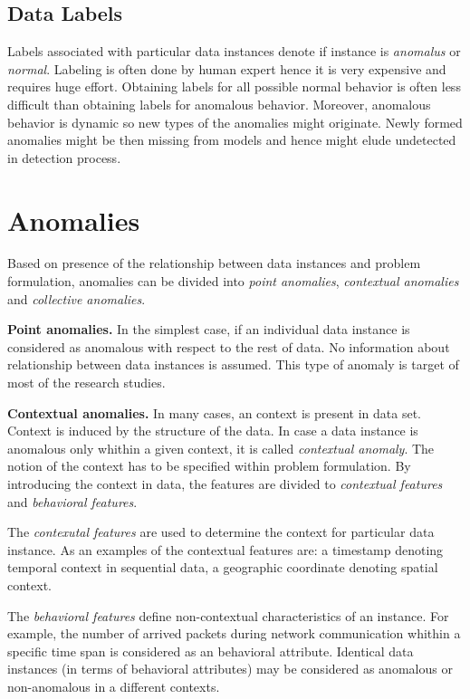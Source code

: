 \subsection{Data Labels}

Labels associated with particular data instances denote if instance is \emph{anomalus}
or \emph{normal}. Labeling is often done by human expert hence it is very expensive and requires
huge effort. Obtaining labels for all possible normal behavior is often less difficult
than obtaining labels for anomalous behavior. Moreover, anomalous behavior is dynamic so
new types of the anomalies might originate. Newly formed anomalies might be then missing 
from models and hence might elude undetected in detection process. 

\section{Anomalies}

Based on presence of the relationship between data instances and problem formulation, anomalies
can be divided into \emph{point anomalies}, \emph{contextual anomalies} and \emph{collective anomalies}.

\textbf{Point anomalies.} In the simplest case, if an individual data instance is considered as
anomalous with respect to the rest of data. No information about relationship between data instances
is assumed. This type of anomaly is target of most of the research studies.

\textbf{Contextual anomalies.} In many cases, an context is present in data set. 
Context is induced by the structure of the data. In case a data instance is anomalous only whithin
a given context, it is called \emph{contextual anomaly}. 
The notion of the context has to be specified within problem formulation. 
By introducing the context in data, the features are divided to \emph{contextual features}
and \emph{behavioral features}.

The \emph{contexutal features} are used to determine the context for 
particular data instance. As an examples of the contextual features are: a timestamp denoting 
temporal context in sequential data, a geographic coordinate denoting spatial context.

The \emph{behavioral features} define non-contextual characteristics of an instance. For example, 
the number of arrived packets during network communication whithin a specific time span is considered 
as an behavioral attribute. Identical data instances (in terms of behavioral attributes) 
may be considered as anomalous or non-anomalous in a different contexts.

